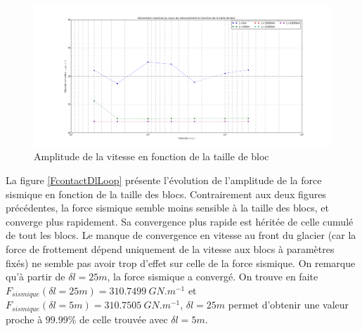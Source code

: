 \documentclass[11pt, a4paper]{article}
\begin{document}
\begin{figure}[h!]
	\centering
	\includegraphics[width=1\linewidth]{figures/Part4/SpeedSlide.png}
	\caption{Amplitude de la vitesse en fonction de la taille de bloc}
    \label{UdmaxDlLoop}
\end{figure}
La figure \ref{FcontactDlLoop} présente l'évolution de l'amplitude de la force sismique en fonction de la taille des blocs. Contrairement aux deux figures précédentes, la force sismique semble moins sensible à la taille des blocs, et converge plus rapidement. Sa convergence plus rapide est héritée de celle cumulé de tout les blocs. Le manque de convergence en vitesse au front du glacier (car la force de frottement dépend uniquement de la vitesse aux blocs à paramètres fixés) ne semble pas avoir trop d'effet sur celle de la force sismique. On remarque qu'à partir de $\delta l = 25m$, la force sismique a convergé. On trouve en faite $F_{sismique}(\delta l =25m) = 310.7499\ GN.m^{-1}$ et $F_{sismique}(\delta l = 5m) = 310.7505\ GN.m^{-1}$, $\delta l = 25 m$ permet d'obtenir une valeur proche à $99.99 \%$ de celle trouvée avec $\delta l = 5 m$.
\\
\end{document}
